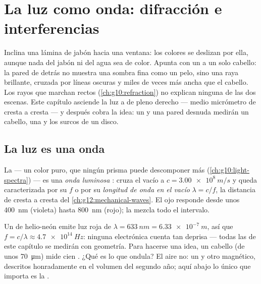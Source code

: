 \chapter{La luz como onda: difracción e interferencias}\label{ch:g12:light-as-wave}

Inclina una lámina de jabón hacia una ventana: los colores se deslizan
por ella, aunque nada del jabón ni del agua sea de color. Apunta con un
 a un solo cabello: la pared de detrás no muestra una sombra fina
como un pelo, sino una raya brillante, cruzada por líneas oscuras y
miles de veces más ancha que el cabello. Los rayos que marchan rectos
(\cref{ch:g10:refraction}) no explican ninguna de las dos escenas. Este
capítulo asciende la luz a  de pleno derecho --- medio micrómetro de
cresta a cresta --- y después cobra la idea: un  y una pared
desnuda medirán un cabello, una  y los surcos de un
disco.

\section{La luz es una onda}

\begin{definition}\label{def:g12:light-as-wave:lightwave}
La  --- un color puro, que ningún prisma puede
descomponer más (\cref{ch:g10:light-spectra}) --- es una \emph{onda
luminosa} : cruza el vacío a
$c = \qty{3.00e8}{m/s}$ y queda caracterizada por su  $f$ o
por su \emph{longitud de onda en el vacío} $\lambda = c/f$, la distancia de cresta a cresta del
\cref{ch:g12:mechanical-waves}. El ojo responde desde unos
\qty{400}{nm} (violeta) hasta \qty{800}{nm} (rojo); la 
mezcla todo el intervalo.
\end{definition}

\begin{example}\label{ex:g12:light-as-wave:orders}
Un  de helio-neón emite luz roja de
$\lambda = \qty{633}{nm} = \qty{6.33e-7}{m}$, así que
$f = c/\lambda \approx \qty{4.7e14}{Hz}$: ninguna electrónica cuenta tan
deprisa --- todas las  de este capítulo se medirán con
geometría. Para hacerse una idea, un cabello (de unos
\qty{70}{\micro m}) mide cien . ¿Qué es lo que ondula?
El aire no: un  y otro magnético, descritos
honradamente en el volumen del segundo año; aquí abajo lo único que
importa es la .
\end{example}

